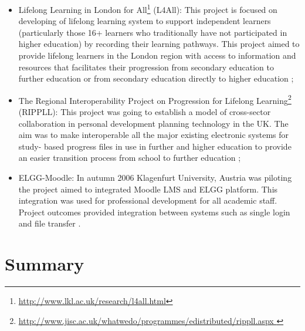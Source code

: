 \begin{itemize}

  \item Lifelong Learning in London for
  All\footnote{\url{http://www.lkl.ac.uk/research/l4all.html}} (L4All): This
  project is focused on developing of lifelong learning system to support
  independent learners (particularly those 16+ learners who traditionally have
  not participated in higher education) by recording their learning pathways.
  This project aimed to provide lifelong learners in the London region with
  access to information and resources that facilitates their progression from
  secondary education to further education or from secondary education directly
  to higher education \citep{Freitas2006};

  \item The Regional Interoperability Project on Progression for Lifelong
Learning\footnote{\url{http://www.jisc.ac.uk/whatwedo/programmes/edistributed/rippll.aspx
}} (RIPPLL): This project was going to establish a model of cross-sector
collaboration in personal development planning technology in the UK. The aim was
to make interoperable all the major existing electronic systems for study- based
progress files in use in further and higher education to provide an easier
transition process from school to further education \citep{Hartnell-Young2006};

  \item ELGG-Moodle: In autumn 2006 Klagenfurt University, Austria was piloting
the project aimed to integrated Moodle LMS and ELGG platform. This integration
was used for professional development for all academic staff. Project outcomes
provided integration between systems such as single login and file transfer
\citep{Attwell2007}.

\end{itemize}

\section{Summary}